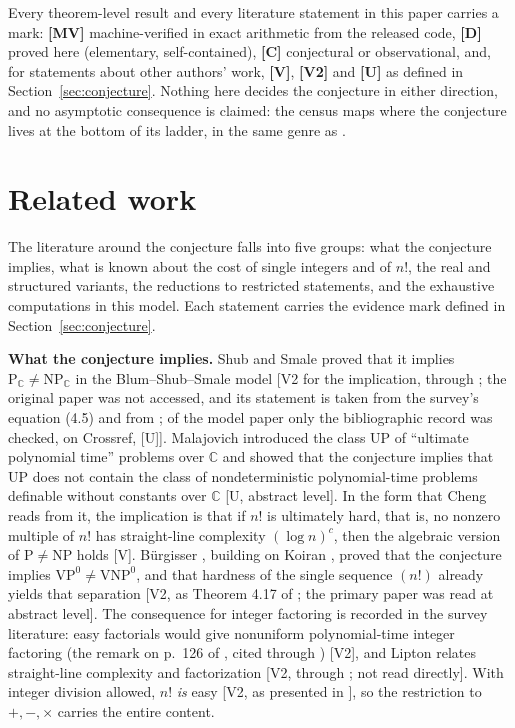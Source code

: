 \documentclass[11pt]{article}
\theoremstyle{definition}
\theoremstyle{remark}
\newcommand{\C}{\mathbb{C}}
\begin{document}
Every theorem-level result and every literature statement in this paper carries a mark:
\textbf{[MV]} machine-verified in exact arithmetic from the released code, \textbf{[D]}
proved here (elementary, self-contained), \textbf{[C]} conjectural or observational, and,
for statements about other authors' work, \textbf{[V]}, \textbf{[V2]} and \textbf{[U]} as
defined in Section~\ref{sec:conjecture}. Nothing here decides the conjecture in
either direction, and no asymptotic consequence is claimed: the census maps where the
conjecture lives at the bottom of its ladder, in the same genre as
\cite{Markstrom2014}.

\section{Related work}\label{sec:related}

The literature around the conjecture falls into five groups: what the conjecture implies, what is
known about the cost of single integers and of $n!$, the real and structured variants, the reductions
to restricted statements, and the exhaustive computations in this model. Each statement carries the
evidence mark defined in Section~\ref{sec:conjecture}.

\textbf{What the conjecture implies.} Shub and Smale proved that it implies
$\mathrm{P}_{\C} \ne \mathrm{NP}_{\C}$ in the Blum--Shub--Smale model
\cite{BSS1989, ShubSmale1995, BCSS1998} [V2 for the implication, through
\cite[\S4.6]{Burgisser2024}; the original paper was not accessed, and its statement is taken
from the survey's equation (4.5) and from \cite{Rojas2003}; of the model paper \cite{BSS1989} only
the bibliographic record was checked, on Crossref, [U]]. Malajovich introduced the class
$\mathrm{UP}$ of ``ultimate polynomial time'' problems over $\C$ and showed that the conjecture
implies that $\mathrm{UP}$ does not contain the class of nondeterministic polynomial-time problems
definable without constants over $\C$ \cite{Malajovich1999} [U, abstract level]. In the form that
Cheng reads from it, the implication is that if $n!$ is
ultimately hard, that is, no nonzero multiple of $n!$ has straight-line complexity
$(\log n)^c$, then the algebraic version of $\mathrm{P} \ne \mathrm{NP}$ holds
\cite[\S1]{Cheng2004} [V]. B\"urgisser \cite{Burgisser2009}, building on Koiran
\cite{Koiran2004}, proved that the conjecture implies $\mathrm{VP}^0 \ne \mathrm{VNP}^0$, and
that hardness of the single sequence $(n!)$ already yields that separation [V2, as
Theorem 4.17 of \cite{Burgisser2024}; the primary paper was read at abstract level]. The
consequence for integer factoring is recorded in the survey literature: easy factorials would
give nonuniform polynomial-time integer factoring (the remark on p.~126 of
\cite{BCSS1998}, cited through \cite{Koiran2004}) [V2], and Lipton relates straight-line
complexity and factorization \cite{Lipton1994} [V2, through \cite[\S4.6]{Burgisser2024}; not
read directly]. With integer division allowed, $n!$ \emph{is} easy \cite{Shamir1979} [V2, as
presented in \cite{Koiran2004}], so the restriction to $+,-,\times$ carries the entire
content.
\end{document}
